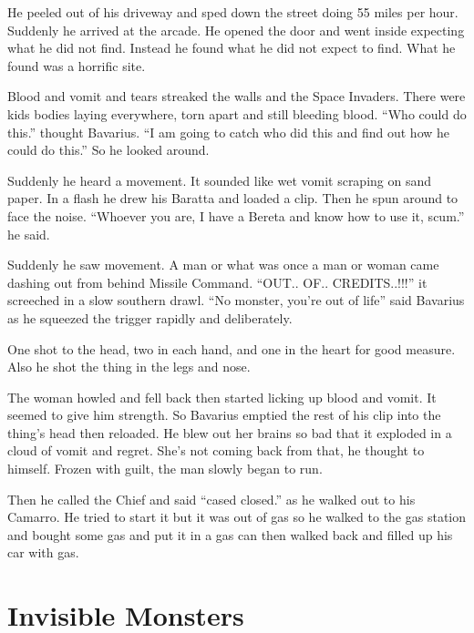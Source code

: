 He peeled out of his driveway and sped down the street doing 55
miles per hour. Suddenly he arrived at the arcade. He opened the
door and went inside expecting what he did not find. Instead he
found what he did not expect to find. What he found was a horrific
site.



Blood and vomit and tears streaked the walls and the Space
Invaders. There were kids bodies laying everywhere, torn apart and
still bleeding blood. ``Who could do this.'' thought Bavarius. ``I am
going to catch who did this and find out how he could do this.'' So
he looked around.



Suddenly he heard a movement. It sounded like wet vomit scraping on
sand paper. In a flash he drew his Baratta and loaded a clip. Then
he spun around to face the noise. ``Whoever you are, I have a Bereta
and know how to use it, scum.'' he said.



Suddenly he saw movement. A man or what was once a man or woman
came dashing out from behind Missile Command. ``OUT.. OF..
CREDITS..!!!'' it screeched in a slow southern drawl. ``No monster,
you're out of life'' said Bavarius as he squeezed the trigger
rapidly and deliberately.



One shot to the head, two in each hand, and one in the heart for
good measure. Also he shot the thing in the legs and nose.



The woman howled and fell back then started licking up blood and
vomit. It seemed to give him strength. So Bavarius emptied the rest
of his clip into the thing's head then reloaded. He blew out her
brains so bad that it exploded in a cloud of vomit and regret.
She's not coming back from that, he thought to himself. Frozen with
guilt, the man slowly began to run.



Then he called the Chief and said ``cased closed.'' as he walked out
to his Camarro. He tried to start it but it was out of gas so he
walked to the gas station and bought some gas and put it in a gas
can then walked back and filled up his car with gas. 

 



\chapter{Invisible Monsters}




